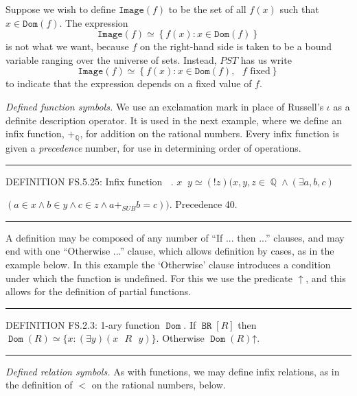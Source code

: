 \documentclass{llncs}
\newcommand{\myrule}{\noindent \rule{\textwidth}{0.3mm}}
\newcommand{\na}[1]{\mathit{#1}}    \newcommand{\fn}[1]{\mathit{#1}}    \newcommand{\ax}[1]{\mathit{(#1)}}  \newcommand{\mdl}[1]{\mathcal{#1}}
\newcommand{\set}[1]{\left\lbrace #1 \right\rbrace}
\begin{document}
Suppose we wish to define $\mathtt{Image}(f)$ to be the
set of all $f(x)$ such that $x \in \mathtt{Dom}(f)$. The expression
\[ \mathtt{Image}(f) \simeq \set{f(x) : x \in \mathtt{Dom}(f)} \] is
not what we want, because $f$ on the right-hand side is taken to be a
bound variable ranging over the universe of sets. Instead, $\na{PST}$
has us write
\[ \mathtt{Image}(f) \simeq \set{f(x) : x \in \mathtt{Dom}(f),
   \mbox{ $f$ fixed} } \]
to indicate that the expression depends on a fixed value of $f$. 

\bigskip

\noindent \emph{Defined function symbols.} We use an exclamation mark
in place of Russell's $\iota$ as a definite description operator.
It is used in the next example, where we define an infix function,
$+_{\mathbb{Q}}$, for addition on the rational numbers. Every infix function
is given a \emph{precedence} number, for use in determining order of
operations.

\medskip

\myrule

\noindent DEFINITION FS.5.25: Infix function $\mathop{\mathtt{+_{\mathbb{Q}}}}$. $x
\mathop{\mathtt{+_{\mathbb{Q}}}} y \simeq (! z)(x,y,z \mathop{\mathtt{\in}}
\mathop{\mathtt{\mathbb{Q}}} \wedge (\exists a,b,c)$

\noindent $(a \mathop{\mathtt{\in}} x \wedge b
\mathop{\mathtt{\in}} y \wedge c \mathop{\mathtt{\in}} z \wedge a +_{SUB} b =
c))$. Precedence 40.

\myrule

\medskip
A definition may be composed of any number of ``If ... then ...'' clauses, and may end with one ``Otherwise ...'' clause, which allows definition by cases, as in the example below. In this example the `Otherwise' clause introduces a condition under which the function is undefined. For this we use the predicate $\uparrow$, and this allows for the definition of partial functions.

\medskip

\myrule

\noindent DEFINITION FS.2.3: 1-ary function $\mathop{\mathtt{Dom}}$. If
$\mathop{\mathtt{BR}}[R]$ then $\mathop{\mathtt{Dom}}(R) \simeq \lbrace x :
(\exists y)(x \mbox{ $R$ } y) \rbrace $. Otherwise
$\mathop{\mathtt{Dom}}(R)\mathord{\uparrow}$.

\myrule

\bigskip

\noindent \emph{Defined relation symbols.} As with functions, we may define infix relations, as in the definition of $<$ on the rational numbers, below.
\medskip
\end{document}
